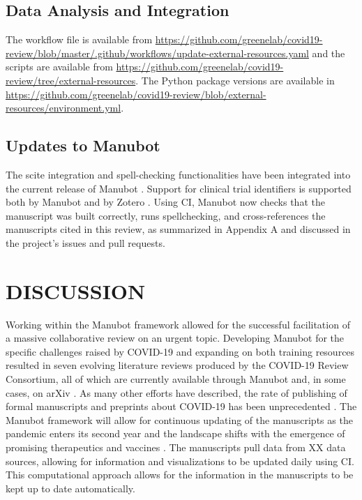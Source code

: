 \documentclass[sigconf]{acmart}
\begin{document}
\hypertarget{data-analysis-and-integration}{%
\subsection{Data Analysis and Integration}\label{data-analysis-and-integration}}

The workflow file is available from \url{https://github.com/greenelab/covid19-review/blob/master/.github/workflows/update-external-resources.yaml} and the scripts are available from \url{https://github.com/greenelab/covid19-review/tree/external-resources}.
The Python package versions are available in \url{https://github.com/greenelab/covid19-review/blob/external-resources/environment.yml}.

\hypertarget{updates-to-manubot}{%
\subsection{Updates to Manubot}\label{updates-to-manubot}}

The scite integration and spell-checking functionalities have been integrated into the current release of Manubot .
Support for clinical trial identifiers is supported both by Manubot and by Zotero .
Using CI, Manubot now checks that the manuscript was built correctly, runs spellchecking, and cross-references the manuscripts cited in this review, as summarized in Appendix A and discussed in the project's issues and pull requests.

\hypertarget{discussion}{%
\section{DISCUSSION}\label{discussion}}

Working within the Manubot framework allowed for the successful facilitation of a massive collaborative review on an urgent topic.
Developing Manubot for the specific challenges raised by COVID-19 and expanding on both training resources resulted in seven evolving literature reviews produced by the COVID-19 Review Consortium, all of which are currently available through Manubot and, in some cases, on arXiv .
As many other efforts have described, the rate of publishing of formal manuscripts and preprints about COVID-19 has been unprecedented \citep{7ub6VM4Z}.
The Manubot framework will allow for continuous updating of the manuscripts as the pandemic enters its second year and the landscape shifts with the emergence of promising therapeutics and vaccines \citep{individual-therapeutics, i2CGFwI3}.
The manuscripts pull data from XX data sources, allowing for information and visualizations to be updated daily using CI.
This computational approach allows for the information in the manuscripts to be kept up to date automatically.
\end{document}
